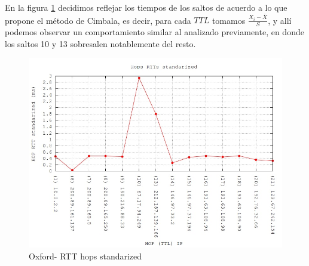 En la figura \ref{tiempos-oxford-estandarizados} decidimos reflejar los tiempos de los saltos de acuerdo a lo que propone el método de Cimbala, es decir, para cada $TTL$ tomamos $\frac{X_i - \bar{X}}{S}$, y allí podemos observar un comportamiento similar al analizado previamente, en donde los saltos 10 y 13 sobresalen notablemente del resto.


\begin{figure}[!htbp]
  \centering
    \includegraphics[scale=0.5]{imagenes/oxford-graficos/traceroute-oxford-standarized.jpg}
  \caption{Oxford- RTT hops standarized}
  \label{tiempos-oxford-estandarizados}
\end{figure}



